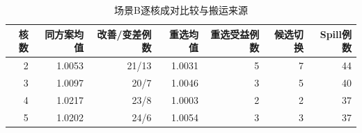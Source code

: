 \begin{table}[htbp]\centering
\caption{场景B逐核成对比较与搬运来源}\label{tab:q2-paired-deep}
\small\begin{tabular}{rrrrrrr}\toprule
核数 & 同方案均值 & 改善/变差例数 & 重选均值 & 重选受益例数 & 候选切换 & Spill例数 \\ \midrule
2 & 1.0053 & 21/13 & 1.0031 & 5 & 7 & 44 \\
3 & 1.0097 & 20/7 & 1.0046 & 3 & 5 & 40 \\
4 & 1.0217 & 23/8 & 1.0003 & 2 & 2 & 37 \\
5 & 1.0202 & 24/6 & 1.0054 & 3 & 3 & 37 \\
\bottomrule\end{tabular}\end{table}
